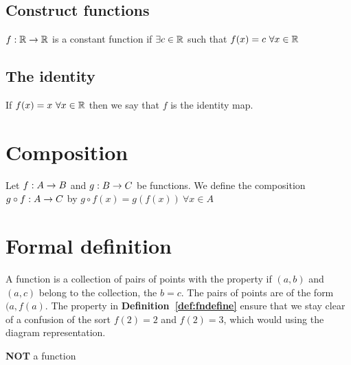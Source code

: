 \subsection{Construct functions}
\begin{definition}
    $f: \mathbb R\rightarrow\mathbb R$ is a constant function if $\exists c \in \mathbb R$ such that $f(x) = c\ \forall x \in \mathbb R$
\end{definition}

\subsection{The identity}
\begin{definition}
    If $f(x) = x\ \forall x \in \mathbb R$ then we say that $f$ is the identity map.
\end{definition}

\section{Composition}
\begin{definition}
    Let $f:A \rightarrow B$ and $g:B\rightarrow C$ be functions.
    We define the composition $g \circ f : A \rightarrow C$ by $g \circ f(x) = g(f(x))\ \forall x \in A$
\end{definition}

\section{Formal definition}
\begin{definition}\label{def:fndefine}
    A function is a collection of pairs of points with the property if $(a, b)$ and $(a, c)$ belong to the collection, the $b = c$. 
    The pairs of points are of the form $(a, f(a)$. 
    The property in \textbf{Definition~\ref{def:fndefine}} ensure that we stay clear of a confusion of the sort $f(2) = 2$ and $f(2) = 3$, which would using the diagram representation.
\begin{center}

\textbf{NOT} a function
\end{center}
\end{definition}


